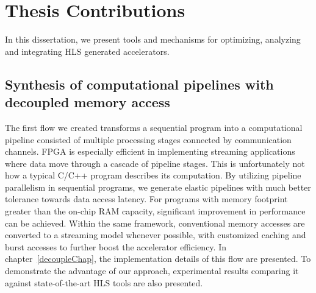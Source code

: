 


\section{Thesis Contributions}
In this dissertation, we present tools and mechanisms for optimizing, analyzing and integrating HLS generated accelerators.

\subsection{Synthesis of computational pipelines with decoupled memory access}

The first flow we created transforms a sequential program into a computational pipeline consisted of multiple
processing stages connected by communication channels. FPGA is especially efficient in implementing streaming 
applications where data move through a cascade of pipeline stages. This is unfortunately not how a typical 
C/C++ program describes its computation. By utilizing pipeline parallelism in sequential programs, 
we generate elastic pipelines with much better tolerance towards data access latency.
For programs with memory footprint greater than the on-chip RAM capacity, significant improvement in performance
can be achieved. Within the same framework, conventional memory accesses are converted to a streaming model whenever
possible, with customized caching and burst accesses to further boost the accelerator efficiency. 
In chapter~\ref{decoupleChap}, the implementation details of this flow are presented. To demonstrate 
the advantage of our approach, experimental results comparing it against state-of-the-art HLS tools
are also presented.


